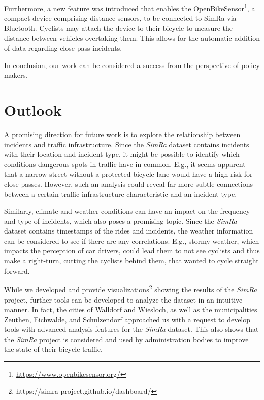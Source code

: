 Furthermore, a new feature was introduced that enables the OpenBikeSensor\footnote{\url{https://www.openbikesensor.org/}}, a compact device comprising distance sensors, to be connected to SimRa via Bluetooth.
Cyclists may attach the device to their bicycle to measure the distance between vehicles overtaking them. This allows for the automatic addition of data regarding close pass incidents.

In conclusion, our work can be considered a success from the perspective of policy makers.

\section*{Outlook}
\label{sec:outlook}
A promising direction for future work is to explore the relationship between incidents and traffic infrastructure.
Since the \textit{SimRa} dataset contains incidents with their location and incident type, it might be possible to identify which conditions dangerous spots in traffic have in common.
E.g., it seems apparent that a narrow street without a protected bicycle lane would have a high risk for close passes.
However, such an analysis could reveal far more subtle connections between a certain traffic infrastructure characteristic and an incident type.

Similarly, climate and weather conditions can have an impact on the frequency and type of incidents, which also poses a promising topic.
Since the \textit{SimRa} dataset contains timestamps of the rides and incidents, the weather information can be considered to see if there are any correlations.
E.g., stormy weather, which impacts the perception of car drivers, could lead them to not see cyclists and thus make a right-turn, cutting the cyclists behind them, that wanted to cycle straight forward.

While we developed and provide visualizations\footnote{https://simra-project.github.io/dashboard/} showing the results of the \textit{SimRa} project, further tools can be developed to analyze the dataset in an intuitive manner.
In fact, the cities of Walldorf and Wiesloch, as well as the municipalities Zeuthen, Eichwalde, and Schulzendorf approached us with a request to develop tools with advanced analysis features for the \textit{SimRa} dataset.
This also shows that the \textit{SimRa} project is considered and used by administration bodies to improve the state of their bicycle traffic.
 